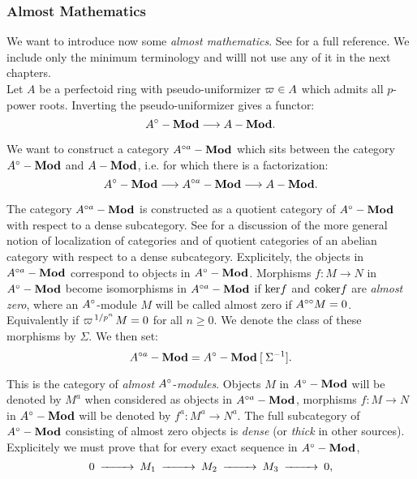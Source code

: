 \subsubsection{Almost Mathematics}
We want to introduce now some \emph{almost mathematics}. See \cite{GR03} for a full reference. We include only the minimum terminology and willl not use any of it in the next chapters.\\

Let $A$ be a perfectoid ring with pseudo-uniformizer $\varpi\in A$ which admits all $p$-power roots. Inverting the pseudo-uniformizer gives a functor:
\[A{^{\circ}}-\mathbf{Mod}\longrightarrow A-\mathbf{Mod}.\]

We want to construct a category $A{^{\circ a}}-\mathbf{Mod}$ which sits between the category $A{^{\circ}}-\mathbf{Mod}$ and $A-\mathbf{Mod}$, i.e.
for which there is a factorization:
\[A{^{\circ}}-\mathbf{Mod}\longrightarrow A{^{\circ a}}-\mathbf{Mod}\longrightarrow A-\mathbf{Mod}.\]


The category $A{^{\circ a}}-\mathbf{Mod}$ is constructed as a quotient category of $A{^{\circ}}-\mathbf{Mod}$ with respect to 
a dense subcategory. See \cite[chapter 4]{Popescu73} for a discussion of the more general notion of localization of categories and of quotient categories of an abelian category with respect to a dense subcategory.
Explicitely, the objects in $A{^{\circ a}}-\mathbf{Mod}$ correspond to objects in $A{^{\circ}}-\mathbf{Mod}$. 
Morphisms $f\colon M\to N$ in $A{^{\circ}}-\mathbf{Mod}$ become isomorphisms in $A{^{\circ a}}-\mathbf{Mod}$  if
${\rm{ker}} f$ and ${\rm{coker}} f$ are \emph{almost zero}, where an $A{^{\circ}}$-module $M$ will be called almost zero if $A^{\circ\circ} M=0$. Equivalently if $\varpi^{\left.1\middle/p^n\right.}M=0$ for all $n\geq 0$.
We denote the class of these morphisms by $\Sigma$. We then set:
\[A{^{\circ a}}-\mathbf{Mod} =  A{^{\circ}}-\mathbf{Mod}\:[\:\Sigma^{-1}].\]

This is the category of \emph{almost} $A{^{\circ}}$-\emph{modules}.
Objects $M$ in $A{^{\circ}}-\mathbf{Mod}$ will be denoted by $M^{a}$ when considered as objects in $A{^{\circ a}}-\mathbf{Mod}$,
morphisms $f\colon M\to N$ in $A{^{\circ}}-\mathbf{Mod}$ will be denoted by $f^a\colon M^a\to N^a$.
The full subcategory of $A{^{\circ}}-\mathbf{Mod}$ consisting of almost zero objects is \emph{dense} (or \emph{thick} in other sources). Explicitely we must prove that
for every exact sequence in $A{^{\circ}}-\mathbf{Mod}$, 
$$\begin{CD}
0 @>>> M_1 @>>> M_2 @>>> M_3 @>>> 0,	
\end{CD}$$

